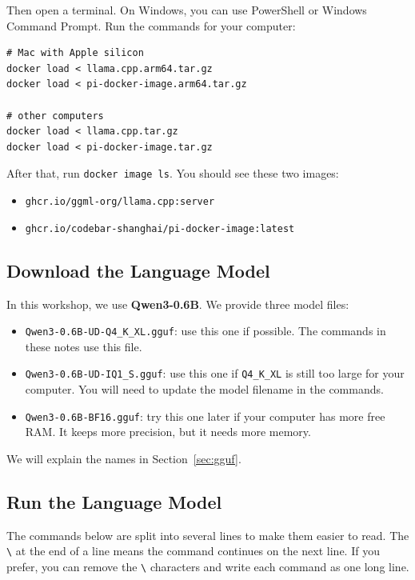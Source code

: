 \documentclass[a4paper,12pt]{article}
\begin{document}
Then open a terminal. On Windows, you can use PowerShell or Windows Command Prompt. Run the commands for your computer:

\begin{verbatim}
# Mac with Apple silicon
docker load < llama.cpp.arm64.tar.gz
docker load < pi-docker-image.arm64.tar.gz

# other computers
docker load < llama.cpp.tar.gz
docker load < pi-docker-image.tar.gz
\end{verbatim}

After that, run \verb|docker image ls|. You should see these two images:

\begin{itemize}
\item \texttt{ghcr.io/ggml-org/llama.cpp:server}
\item \texttt{ghcr.io/codebar-shanghai/pi-docker-image:latest}
\end{itemize}

\subsection{Download the Language Model}

In this workshop, we use \textbf{Qwen3-0.6B}. We provide three model files:

\begin{itemize}
\item \texttt{Qwen3-0.6B-UD-Q4\_K\_XL.gguf}: use this one if possible. The commands in these notes use this file.
\item \texttt{Qwen3-0.6B-UD-IQ1\_S.gguf}: use this one if \texttt{Q4\_K\_XL} is still too large for your computer. You will need to update the model filename in the commands.
\item \texttt{Qwen3-0.6B-BF16.gguf}: try this one later if your computer has more free RAM. It keeps more precision, but it needs more memory.
\end{itemize}

We will explain the names in Section~\ref{sec:gguf}.

\subsection{Run the Language Model}
\label{sec:run-llama.cpp}

The commands below are split into several lines to make them easier to read. The \texttt{\textbackslash} at the end of a line means the command continues on the next line. If you prefer, you can remove the \texttt{\textbackslash} characters and write each command as one long line.
\end{document}
